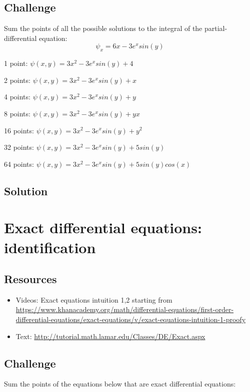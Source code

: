 \subsection*{Challenge}
Sum the points of all the possible solutions to the integral of the partial-differential equation:
\begin{equation}
    \psi_x = 6x - 3e^x sin(y)
\end{equation}

1 point: $\psi(x,y) = 3x^2-3e^x sin(y) + 4$

2 points: $\psi(x,y) = 3x^2-3e^x sin(y) + x$

4 points: $\psi(x,y) = 3x^2-3e^x sin(y) + y$

8 points: $\psi(x,y) = 3x^2-3e^x sin(y) + yx$

16 points: $\psi(x,y) = 3x^2-3e^x sin(y) + y^2$

32 points: $\psi(x,y) = 3x^2-3e^x sin(y) + 5 sin(y)$

64 points: $\psi(x,y) = 3x^2-3e^x sin(y) + 5 sin(y)cos(x)$

\subsection*{Solution}
\six{}





\newpage
\section{Exact differential equations: identification}
\label{sec:edeid}

\subsection*{Resources}
\begin{itemize}
    \item Videos: Exact equations intuition 1,2 starting from \url{https://www.khanacademy.org/math/differential-equations/first-order-differential-equations/exact-equations/v/exact-equations-intuition-1-proofy}
    \item Text: \url{http://tutorial.math.lamar.edu/Classes/DE/Exact.aspx}
\end{itemize}

\subsection*{Challenge}
Sum the points of the equations below that are exact differential equations:


